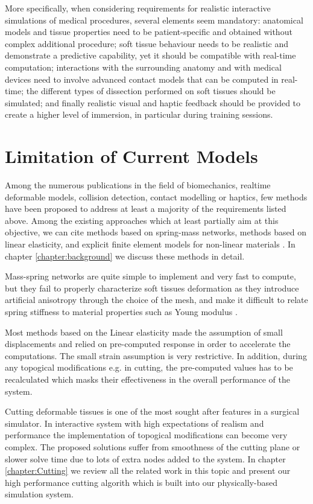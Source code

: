More specifically, when considering requirements for realistic interactive simulations of medical procedures, several elements seem mandatory: anatomical 
models and tissue properties need to be patient-specific and obtained without complex additional procedure; soft tissue behaviour needs to be realistic and 
demonstrate a predictive capability, yet it should be compatible with real-time computation; interactions with the surrounding anatomy and with medical 
devices need to involve advanced contact models that can be computed in real-time; the different types of dissection performed on soft tissues should be 
simulated; and finally realistic visual and haptic feedback should be provided to create a higher level of immersion, in particular during training sessions.

\section{Limitation of Current Models}
Among the numerous publications in the field of biomechanics, realtime deformable models, collision detection, contact modelling or haptics, 
few methods have been proposed to address at least a majority of the requirements listed above. Among the existing approaches which at least 
partially aim at this objective, we can cite methods based on spring-mass networks, methods based on linear elasticity, and explicit finite element models 
for non-linear materials \cite{Gibson1997a,Meier2005}. In chapter \ref{chapter:background} we discuss these methods in detail.  

Mass-spring networks are quite simple to implement and very fast to compute, but they fail to properly characterize soft tissues deformation as they 
introduce artificial anisotropy through the choice of the mesh, and make it difficult to relate spring stiffness to material properties such as Young modulus 
\cite{Courtecuisse2010}.

Most methods based on the Linear elasticity made the assumption of small displacements and relied on pre-computed response in order to accelerate the 
computations. The small strain assumption is very restrictive. In addition, during any topogical modifications e.g. in cutting, the pre-computed values 
has to be recalculated which masks their effectiveness in the overall performance of the system.

Cutting deformable tissues is one of the most sought after features in a surgical simulator. In interactive system with high expectations of realism and 
performance the implementation of topogical modifications can become very complex. The proposed solutions suffer from smoothness of the cutting plane or slower
solve time due to lots of extra nodes added to the system. In chapter \ref{chapter:Cutting} we review all the related work in this topic and present our
high performance cutting algorith which is built into our physically-based simulation system.


